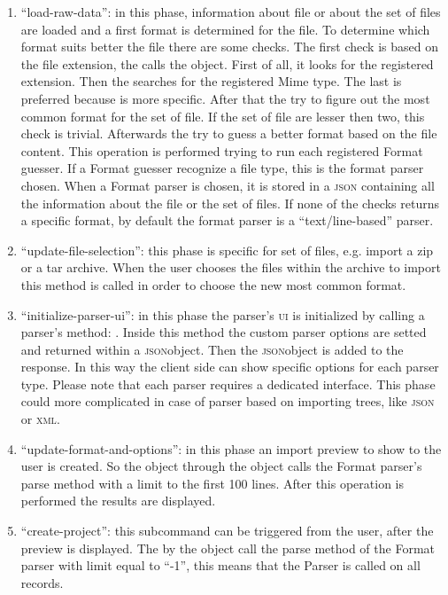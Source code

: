 \begin{enumerate}
	\item \textsf{``load-raw-data''}: in this phase, information about  file or about the set of files are loaded and a first format is determined for the file. To determine which format suits better the file there are some checks. The first check is based on the file extension, the  calls the  object. First of all, it looks for the registered extension. Then the  searches for the registered Mime type. The last is preferred because is more specific. After that the  try to figure out the most common format for the set of file. If the set of file are lesser then two, this check is trivial. Afterwards the  try to guess a better format based on the file content. This operation is performed trying to run each registered Format guesser. If a Format guesser recognize a file type, this is the format parser chosen. When a Format parser is chosen, it is stored in a \textsc{json} containing all the information about the file or the set of files. If none of the checks returns a specific format, by default the format parser is a ``text/line-based'' parser.
	\item \textsf{``update-file-selection''}: this phase is specific for set of files, e.g. import a zip or a tar archive. When the user chooses the files within the archive to import this method is called in order to choose the new most common format. 
	\item \textsf{``initialize-parser-ui''}: in this phase the parser's \textsc{ui} is initialized by calling a parser's method: . Inside this method the custom parser options are setted and returned within a \textsc{json}object. Then the \textsc{json}object is added to the response. In this way the client side can show specific options for each parser type. Please note that each parser requires a dedicated interface. This phase could more complicated in case of parser based on importing trees, like \textsc{json} or \textsc{xml}.
	\item \textsf{``update-format-and-options''}: in this phase an import preview to show to the user is created. So the  object through the  object calls the Format parser's parse method with a limit to the first 100 lines. After this operation is performed the results are displayed.
	\item \textsf{``create-project''}: this subcommand can be triggered from the user, after the preview is displayed. The  by the  object call the parse method of the Format parser with limit equal to ``-1'', this means that the Parser is called on all records. 
\end{enumerate}

